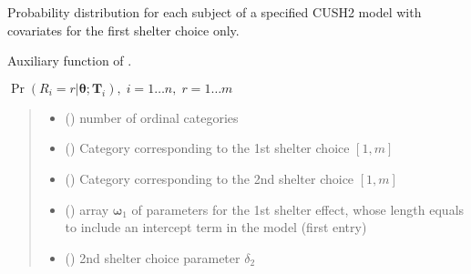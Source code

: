 \documentclass[letterpaper,10pt,english]{sphinxmanual}
\begin{document}

\begin{fulllineitems}
\label{\detokenize{cubmods:cubmods.cush2_x0.pmfi}}
\pysigstartsignatures
{}
\pysigstopsignatures
\sphinxAtStartPar
Probability distribution for each subject of a specified CUSH2 model with covariates
for the first shelter choice only.

\sphinxAtStartPar
Auxiliary function of .

\sphinxAtStartPar
\(\Pr(R_i=r|\pmb\theta; \pmb T_i),\; i=1 \ldots n ,\; r=1 \ldots m\)
\begin{quote}\begin{description}
\begin{itemize}
\item {} 
\sphinxAtStartPar
{} () \textendash{} number of ordinal categories

\item {} 
\sphinxAtStartPar
{} () \textendash{} Category corresponding to the 1st shelter choice \([1,m]\)

\item {} 
\sphinxAtStartPar
{} () \textendash{} Category corresponding to the 2nd shelter choice \([1,m]\)

\item {} 
\sphinxAtStartPar
{} () \textendash{} array \(\pmb \omega_1\) of parameters for the 1st shelter effect, whose length equals 
 to include an intercept term in the model (first entry)

\item {} 
\sphinxAtStartPar
{} () \textendash{} 2nd shelter choice parameter \(\delta_2\)


\end{itemize}
\end{description}
\end{quote}
\end{fulllineitems}
\end{document}
